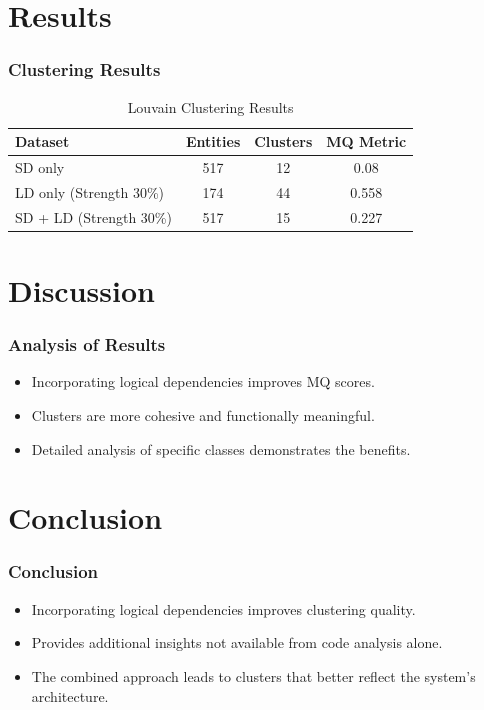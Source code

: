 \documentclass{beamer}
\begin{document}
\section{Results}

\begin{frame}
\frametitle{Clustering Results}
\begin{center}
    \begin{table}
    \centering
    \caption{Louvain Clustering Results}
    \begin{tabular}{lccc}
        \toprule
        \textbf{Dataset} & \textbf{Entities} & \textbf{Clusters} & \textbf{MQ Metric} \\
        \midrule
        SD only & 517 & 12 & 0.08 \\
        LD only (Strength 30\%) & 174 & 44 & 0.558 \\
        SD + LD (Strength 30\%) & 517 & 15 & 0.227 \\
        \bottomrule
    \end{tabular}
    \end{table}
\end{center}
\end{frame}

\section{Discussion}

\begin{frame}
\frametitle{Analysis of Results}
\begin{itemize}
    \item Incorporating logical dependencies improves MQ scores.
    \item Clusters are more cohesive and functionally meaningful.
    \item Detailed analysis of specific classes demonstrates the benefits.
\end{itemize}
\end{frame}


\section{Conclusion}

\begin{frame}
\frametitle{Conclusion}
\begin{itemize}
    \item Incorporating logical dependencies improves clustering quality.
    \item Provides additional insights not available from code analysis alone.
    \item The combined approach leads to clusters that better reflect the system's architecture.
\end{itemize}
\end{frame}
\end{document}

